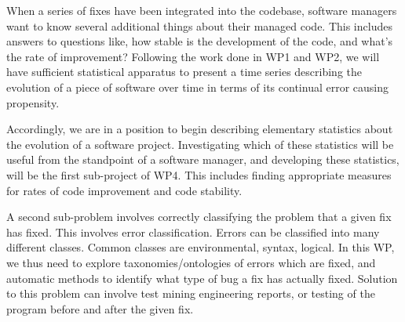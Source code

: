 When a series of fixes have been integrated into the codebase, software managers want to know several additional things about their managed code. This includes answers to questions like, how stable is the development of the code, and what's the rate of improvement?
Following the work done in WP1 and WP2, we will have sufficient statistical apparatus to present a time series describing the evolution of a piece of software over time in terms of its continual error causing propensity. 

Accordingly, 
we are in a position to begin describing elementary statistics about the evolution of a software project. Investigating which of these statistics will be useful from the standpoint of a software manager, and developing these statistics, will be the first sub-project of WP4. 
This includes finding appropriate measures for rates of code improvement and code stability. 

A second sub-problem involves correctly classifying the problem that a given fix has fixed. This involves error classification. Errors can be classified into many different classes. Common classes are environmental, syntax, logical. In this WP, we thus need to explore taxonomies/ontologies of errors which are fixed, and automatic methods to identify what type of bug a fix has actually fixed. Solution to this problem can involve test mining engineering reports, or testing of the program before and after the given fix. 